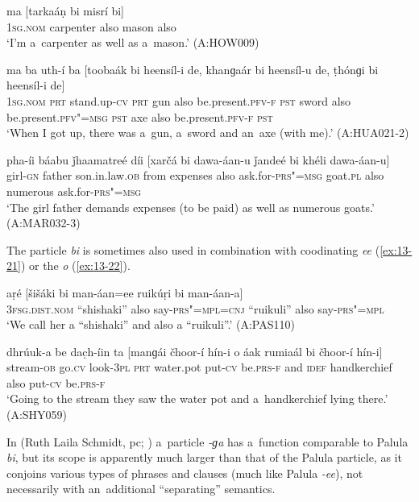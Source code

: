 \begin{exe}
\ex
\label{ex:13-18}
\gll ma [tarkaáṇ bi misrí bi]  \\
\textsc{1sg.nom} carpenter also mason also \\
\glt `I'm a~carpenter as well as a~mason.' (A:HOW009)

\ex
\label{ex:13-19}
\gll ma ba uth-í ba [toobaák bi heensíl-i de, khanɡaár bi heensíl-u de, ṭhónɡi bi heensíl-i de] \\
\textsc{1sg.nom} \textsc{prt} stand.up-\textsc{cv} \textsc{prt} gun also  be.present.\textsc{pfv-f} \textsc{pst} sword also be.present.\textsc{pfv"=msg } \textsc{pst} axe also be.present.\textsc{pfv-f } \textsc{pst} \\
\glt `When I got up, there was a~gun, a~sword and an~axe (with me).' (A:HUA021-2)

\ex
\label{ex:13-20}
\gll pha-íi báabu ǰhaamatreé díi [xarčá bi dawa-áan-u ǰandeé bi khéli dawa-áan-u]  \\
girl-\textsc{gn} father son.in.law.\textsc{ob} from expenses also  ask.for-\textsc{prs"=msg} goat.\textsc{pl} also numerous ask.for-\textsc{prs"=msg} \\
\glt `The girl father demands expenses (to be paid) as well as numerous goats.' (A:MAR032-3) 
\end{exe}

The particle \textit{bi} is sometimes also used in combination with coodinating \textit{ee} (\ref{ex:13-21}) or the  \textit{o} (\ref{ex:13-22}).

\begin{exe}
\ex
\label{ex:13-21}
\gll aṛé  [šišáki  bi man-áan=ee  ruikúṛi bi man-áan-a] \\
\textsc{3fsg.dist.nom} ``shishaki'' also say-\textsc{prs"=mpl=cnj}  ``ruikuli'' also say-\textsc{prs"=mpl}\\
\glt `We call her a ``shishaki'' and also a ``ruikuli''.' (A:PAS110)

\ex
\label{ex:13-22}
\gll dhrúuk-a be dac̣h-íin ta [manɡái čhoor-í hín-i o áak rumiaál bi čhoor-í hín-i]  \\
stream-\textsc{ob} go.\textsc{cv} look-\textsc{3pl} \textsc{prt} water.pot put-\textsc{cv}  be.\textsc{prs-f} and \textsc{idef } handkerchief also put-\textsc{cv} be.\textsc{prs-f } \\
\glt `Going to the stream they saw the water pot and a~handkerchief lying there.' (A:SHY059) 
\end{exe}

In   (Ruth Laila Schmidt, pc; \citealt[252]{schmidtkohistani2008}) a~particle \textit{-ɡa} has a~function comparable to Palula \textit{bi}, but its scope is apparently much larger than that of the Palula particle, as it conjoins various types of phrases and clauses (much like Palula \textit{-ee}), not necessarily with an~additional ``separating'' semantics. 



